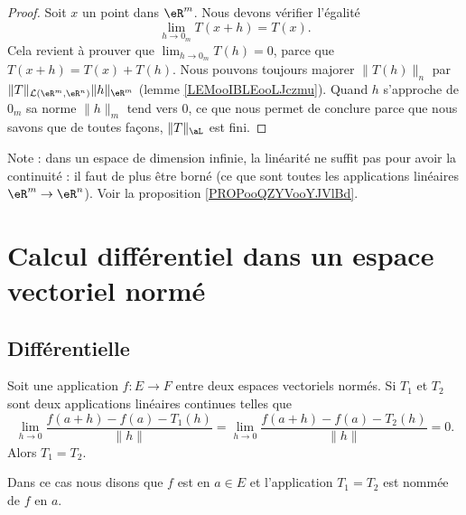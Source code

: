 \begin{proof}
      Soit $x$ un point dans $\eR^m$. Nous devons vérifier l'égalité
      \begin{equation}
       \lim_{h\to 0_m}T(x+h)=T(x).
      \end{equation}
      Cela revient à prouver que $\lim_{h\to 0_m}T(h)=0$, parce que $T(x+h)=T(x)+T(h)$. Nous pouvons toujours majorer $\|T(h)\|_n$ par $\|T\|_{\mathcal{L}(\eR^m,\eR^n)}\| h \|_{\eR^m}$ (lemme \ref{LEMooIBLEooLJczmu}). Quand $h$ s'approche de $ 0_m $ sa norme $\|h\|_m$ tend vers $0$, ce que nous permet de conclure parce que nous savons que de toutes façons, $\| T \|_{\aL}$ est fini.
\end{proof}

Note : dans un espace de dimension infinie, la linéarité ne suffit pas pour avoir la continuité : il faut de plus être borné (ce que sont toutes les applications linéaires \( \eR^m\to\eR^n\)). Voir la proposition \ref{PROPooQZYVooYJVlBd}.

\section{Calcul différentiel dans un espace vectoriel normé}
\label{SecLStKEmc}

\subsection{Différentielle}

\begin{propositionDef}  \label{DefKZXtcIT}
    Soit une application \( f\colon E\to F\) entre deux espaces vectoriels normés. Si \( T_1\) et \( T_2\) sont deux applications linéaires continues telles que
    \begin{equation}\label{EqIQuRGmO}
        \lim_{h\to 0} \frac{ f(a+h)-f(a)-T_1(h) }{ \| h \| }= \lim_{h\to 0} \frac{ f(a+h)-f(a)-T_2(h) }{ \| h \| }  =0.
    \end{equation}
    Alors \( T_1=T_2\).

    Dans ce cas nous disons que \( f\) est  en \( a\in E\) et l'application \( T_1=T_2\) est nommée  de \( f\) en \( a\).
\end{propositionDef}

